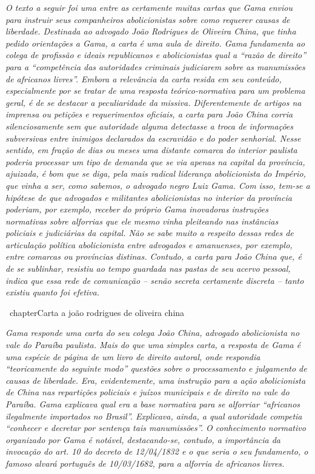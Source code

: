 \begin{didascalia}
\emph{O texto a seguir foi uma entre as certamente muitas cartas que
Gama enviou para instruir seus companheiros abolicionistas sobre como
requerer causas de liberdade. Destinada ao advogado João Rodrigues de
Oliveira China, que tinha pedido orientações a Gama, a carta é uma aula
de direito. Gama fundamenta ao colega de profissão e ideais republicanos
e abolicionistas qual a ``razão de direito'' para a ``competência das
autoridades criminais judiciarem sobre as manumissões de africanos
livres''. Embora a relevância da carta resida em seu conteúdo,
especialmente por se tratar de uma resposta teórico-normativa para um
problema geral, é de se destacar a peculiaridade da missiva.
Diferentemente de artigos na imprensa ou petições e requerimentos
oficiais, a carta para João China corria silenciosamente sem que
autoridade alguma detectasse a troca de informações subversivas entre
inimigos declarados da escravidão e do poder senhorial. Nesse sentido,
em fração de dias ou meses uma distante comarca do interior paulista
poderia processar um tipo de demanda que se via apenas na capital da
província, ajuizada, é bom que se diga, pela mais radical liderança
abolicionista do Império, que vinha a ser, como sabemos, o advogado
negro Luiz Gama. Com isso, tem-se a hipótese de que advogados e
militantes abolicionistas no interior da província poderiam, por
exemplo, receber do próprio Gama inovadoras instruções normativas sobre
alforrias que ele mesmo vinha pleiteando nas instâncias policiais e
judiciárias da capital. Não se sabe muito a respeito dessas redes de
articulação política abolicionista entre advogados e amanuenses, por
exemplo, entre comarcas ou províncias distinas. Contudo, a carta para
João China que, é de se sublinhar, resistiu ao tempo guardada nas pastas
de seu acervo pessoal, indica que essa rede de comunicação -- senão
secreta certamente discreta -- tanto existiu quanto foi efetiva.}
\end{didascalia}

\ chapter{Carta a joão rodrigues de oliveira china}%

\begin{didascalia}
\emph{Gama responde uma carta do seu colega João China, advogado
abolicionista no vale do Paraíba paulista. Mais do que uma simples
carta, a resposta de Gama é uma espécie de página de um livro de direito
autoral, onde respondia ``teoricamente do seguinte modo'' questões sobre o
processamento e julgamento de causas de liberdade. Era, evidentemente,
uma instrução para a ação abolicionista de China nas repartições
policiais e juízos municipais e de direito no vale do Paraíba. Gama
explicava qual era a base normativa para se alforriar ``africanos
ilegalmente importados no Brasil''. Explicava, ainda, a qual autoridade
competia ``conhecer e decretar por sentença tais manumissões''. O
conhecimento normativo organizado por Gama é notável, destacando-se,
contudo, a importância da invocação do art. 10 do decreto de 12/04/1832
e o que seria o seu fundamento, o famoso alvará português de 10/03/1682,
para a alforria de africanos livres.}
\end{didascalia}

